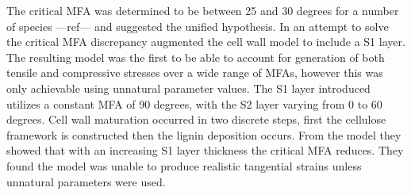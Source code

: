 The critical MFA was determined to be between
25 and 30 degrees for a number of species ---ref--- \citet[in Japanese]{Okuyama_1993} and \citet{ISI:A1995QJ03000001} suggested the
unified hypothesis. In an attempt to solve the critical MFA
discrepancy \citet{ISI:A1995QJ03000001} augmented the \citet{Barber_1964} cell wall
model to include a S1 layer. The resulting model was the first to be able to
account for generation of both tensile and compressive stresses over a wide
range of MFAs, however this was only achievable using unnatural parameter values. The S1 layer introduced utilizes a constant MFA
of 90 degrees, with the S2 layer varying from 0 to 60 degrees. Cell wall maturation
occurred in two discrete steps, first the cellulose framework is constructed then
the lignin deposition occurs. From the model they showed that with an
increasing S1 layer thickness the critical MFA reduces. They found the model
was unable to produce realistic tangential strains unless unnatural parameters
were used.